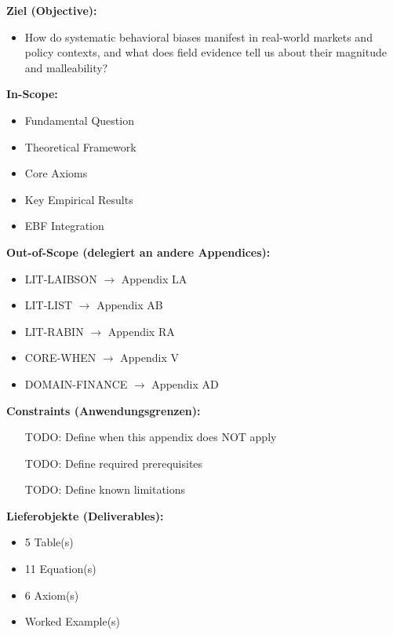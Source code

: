 \begin{tcolorbox}[
    colback=orange!5!white,
    colframe=orange!75!black,
    title={\textbf{Appendix Scope: Ziel / In-Scope / Out-of-Scope / Constraints}},
    fonttitle=\bfseries
]

\textbf{Ziel (Objective):}
\begin{itemize}[nosep]
    \item How do systematic behavioral biases manifest in real-world markets and policy contexts, and what does field evidence tell us about their magnitude and malleability?
\end{itemize}

\textbf{In-Scope:}
\begin{itemize}[nosep]
    \item Fundamental Question
    \item Theoretical Framework
    \item Core Axioms
    \item Key Empirical Results
    \item EBF Integration
\end{itemize}

\textbf{Out-of-Scope (delegiert an andere Appendices):}
\begin{itemize}[nosep]
    \item LIT-LAIBSON $\rightarrow$ Appendix LA
    \item LIT-LIST $\rightarrow$ Appendix AB
    \item LIT-RABIN $\rightarrow$ Appendix RA
    \item CORE-WHEN $\rightarrow$ Appendix V
    \item DOMAIN-FINANCE $\rightarrow$ Appendix AD
\end{itemize}

\textbf{Constraints (Anwendungsgrenzen):}
\begin{itemize}[nosep]
    \item [TODO: Define when this appendix does NOT apply]
    \item [TODO: Define required prerequisites]
    \item [TODO: Define known limitations]
\end{itemize}

\textbf{Lieferobjekte (Deliverables):}
\begin{itemize}[nosep]
    \item 5 Table(s)
    \item 11 Equation(s)
    \item 6 Axiom(s)
    \item Worked Example(s)
\end{itemize}

\end{tcolorbox}


